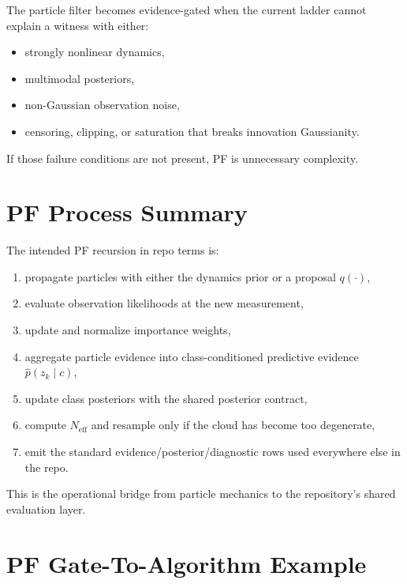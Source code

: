 \documentclass[11pt]{article}
\begin{document}
The particle filter becomes evidence-gated when the current ladder cannot
explain a witness with either:
\begin{itemize}[leftmargin=1.5em]
    \item strongly nonlinear dynamics,
    \item multimodal posteriors,
    \item non-Gaussian observation noise,
    \item censoring, clipping, or saturation that breaks innovation Gaussianity.
\end{itemize}
If those failure conditions are not present, PF is unnecessary complexity.

\section{PF Process Summary}

The intended PF recursion in repo terms is:
\begin{enumerate}[leftmargin=1.5em]
    \item propagate particles with either the dynamics prior or a proposal
    \(q(\cdot)\),
    \item evaluate observation likelihoods at the new measurement,
    \item update and normalize importance weights,
    \item aggregate particle evidence into class-conditioned predictive
    evidence \(\hat{p}(z_k \mid c)\),
    \item update class posteriors with the shared posterior contract,
    \item compute \(N_{\mathrm{eff}}\) and resample only if the cloud has
    become too degenerate,
    \item emit the standard evidence/posterior/diagnostic rows used everywhere
    else in the repo.
\end{enumerate}
This is the operational bridge from particle mechanics to the repository's
shared evaluation layer.

\section{PF Gate-To-Algorithm Example}
\end{document}
